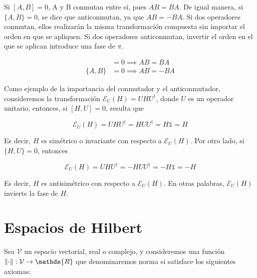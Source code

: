 Si $[A,B] = 0$, A y B conmutan entre sí, pues $AB = BA$. De igual manera, si $\{A,B\} = 0$, se dice que anticonmutan, ya que $AB = -BA$. Si dos operadores conmutan, ellos realizarán la misma transformación compuesta sin importar el orden en que se apliquen. Si dos operadores anticonmutan, invertir el orden en el que se aplican introduce una fase de $\pi$.

\begin{align}
    [A,B] &= 0 \implies A B = B A \\
    \{A,B\} &= 0 \implies A B = - B A
\end{align}

Como ejemplo de la importancia del conmutador y el anticonmutador, consideremos la transformación $\mathcal{E}_U(H) = U H U^\dagger$, donde $U$ es un operador unitario, entonces, si $[H,U] = 0$, resulta que

\begin{equation}
    \mathcal{E}_U(H) = U H U^\dagger = H U U^\dagger = H \mathds{1} = H
\end{equation}

Es decir, $H$ es simétrico o invariante con respecto a $\mathcal{E}_U(H)$. Por otro lado, si $\{H,U\} = 0$, entonces

\begin{equation}
    \mathcal{E}_U(H) = U H U^\dagger = - H U U^\dagger = - H \mathds{1} = - H
\end{equation}

Es decir, $H$ es antisimétrico con respecto a $\mathcal{E}_U(H)$. En otras palabras, $\mathcal{E}_U(H)$ invierte la fase de $H$.

\section{Espacios de Hilbert}

Sea $\mathcal{V}$ un espacio vectorial, real o complejo, y consideremos una función $\norm{\cdot}: \mathcal{V} \rightarrow \mathds{R}$ que denominaremos norma si satisface los siguientes axiomas:

